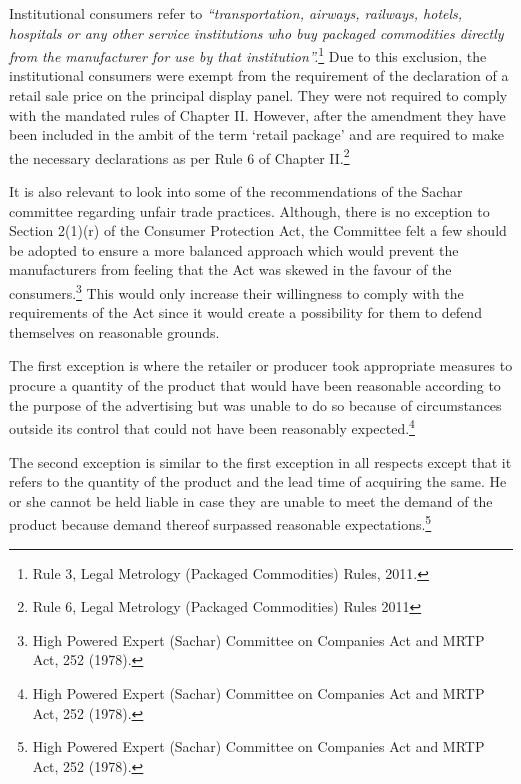 \begin{multicols}{2}
\noi
Institutional consumers refer to \textit{“transportation, airways, railways, hotels, hospitals or any
other service institutions who buy packaged commodities directly from the manufacturer for
use by that institution”.}\footnote{Rule 3, Legal Metrology (Packaged Commodities) Rules, 2011.} Due to this exclusion, the institutional consumers were exempt from the requirement of the declaration of a retail sale price on the principal display panel. They were not required to comply with the mandated rules of Chapter II. However, after the amendment they have been included in the ambit of the term ‘retail package’ and are required to make the necessary declarations as per Rule 6 of Chapter II.\footnote{Rule 6, Legal Metrology (Packaged Commodities) Rules 2011}

\vspace{-.15cm}

\noi
It is also relevant to look into some of the recommendations of the Sachar committee regarding
unfair trade practices. Although, there is no exception to Section 2(1)(r) of the Consumer
Protection Act, the Committee felt a few should be adopted to ensure a more balanced approach
which would prevent the manufacturers from feeling that the Act was skewed in the favour of
the consumers.\footnote{High Powered Expert (Sachar) Committee on Companies Act and MRTP Act, 252 (1978).} This would only increase their willingness to comply with the requirements
of the Act since it would create a possibility for them to defend themselves on reasonable
grounds.

\vspace{-.15cm}

\noi
The first exception is where the retailer or producer took appropriate measures to procure a
quantity of the product that would have been reasonable according to the purpose of the
advertising but was unable to do so because of circumstances outside its control that could not
have been reasonably expected.\footnote{High Powered Expert (Sachar) Committee on Companies Act and MRTP Act, 252 (1978).}

\noi
The second exception is similar to the first exception in all respects except that it refers to the
quantity of the product and the lead time of acquiring the same. He or she cannot be held liable
in case they are unable to meet the demand of the product because demand thereof surpassed
reasonable expectations.\footnote{High Powered Expert (Sachar) Committee on Companies Act and MRTP Act, 252 (1978).}


\end{multicols}
